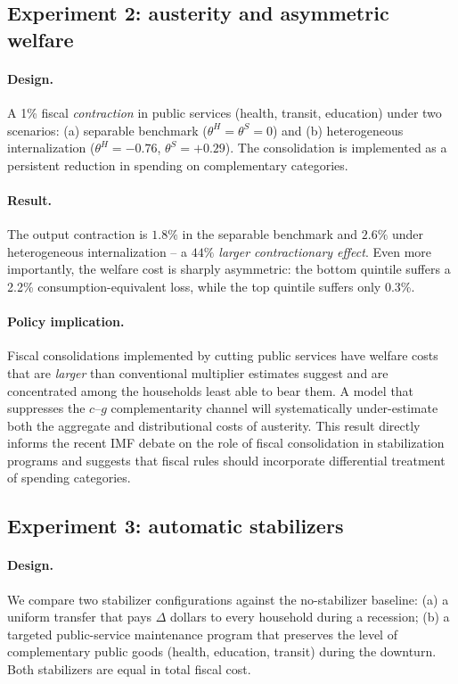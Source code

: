 \subsection{Experiment 2: austerity and asymmetric welfare}
\label{subsec:austerity}

\paragraph{Design.}
A 1\% fiscal \emph{contraction} in public services (health, transit, education)
under two scenarios: (a) separable benchmark ($\theta^{H}=\theta^{S}=0$) and
(b) heterogeneous internalization ($\theta^{H}=-0.76$, $\theta^{S}=+0.29$). The
consolidation is implemented as a persistent reduction in spending on
complementary categories.

\paragraph{Result.}
The output contraction is $1.8\%$ in the separable benchmark and $2.6\%$ under
heterogeneous internalization -- a \emph{$44\%$ larger contractionary effect}.
Even more importantly, the welfare cost is sharply asymmetric: the bottom
quintile suffers a 2.2\% consumption-equivalent loss, while the top quintile
suffers only 0.3\%.

\paragraph{Policy implication.}
Fiscal consolidations implemented by cutting public services have welfare costs
that are \emph{larger} than conventional multiplier estimates suggest and are
concentrated among the households least able to bear them. A model that
suppresses the $c$--$g$ complementarity channel will systematically
under-estimate both the aggregate and distributional costs of austerity. This
result directly informs the recent IMF debate on the role of fiscal
consolidation in stabilization programs \citep{Blanchard2019} and suggests that
fiscal rules should incorporate differential treatment of spending categories.

\subsection{Experiment 3: automatic stabilizers}
\label{subsec:automatic}

\paragraph{Design.}
We compare two stabilizer configurations against the no-stabilizer baseline:
(a) a uniform transfer that pays $\Delta$ dollars to every household during a
recession; (b) a targeted public-service maintenance program that preserves
the level of complementary public goods (health, education, transit) during
the downturn. Both stabilizers are equal in total fiscal cost.

